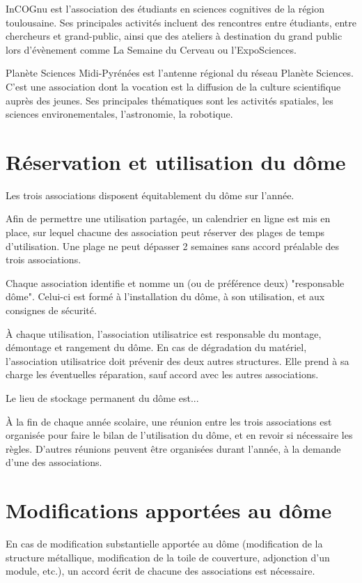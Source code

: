 \documentclass[a4paper,12pt]{article}
\begin{document}
InCOGnu est l'association des étudiants en sciences cognitives de la région
toulousaine. Ses principales activités incluent des rencontres entre étudiants,
entre chercheurs et grand-public, ainsi que des ateliers à destination du grand
public lors d'évènement comme La Semaine du Cerveau ou l'ExpoSciences.

Planète Sciences Midi-Pyrénées est l'antenne régional du réseau Planète
Sciences. C'est une association dont la vocation est la diffusion de la culture
scientifique auprès des jeunes. Ses principales thématiques sont les activités
spatiales, les sciences environementales, l'astronomie, la robotique.

\section{Réservation et utilisation du dôme}

Les trois associations disposent équitablement du dôme sur l'année.

Afin de permettre une utilisation partagée, un calendrier en ligne est mis en
place, sur lequel chacune des association peut réserver des plages de temps
d'utilisation. Une plage ne peut dépasser 2 semaines sans accord préalable des
trois associations.

Chaque association identifie et nomme un (ou de préférence deux) "responsable
dôme". Celui-ci est formé à l'installation du dôme, à son utilisation, et aux
consignes de sécurité.

À chaque utilisation, l'association utilisatrice est responsable du montage,
démontage et rangement du dôme. En cas de dégradation du matériel,
l'association utilisatrice doit prévenir des deux autres structures. Elle prend
à sa charge les éventuelles réparation, sauf accord avec les autres
associations.

Le lieu de stockage permanent du dôme est...

À la fin de chaque année scolaire, une réunion entre les trois associations est
organisée pour faire le bilan de l'utilisation du dôme, et en revoir si
nécessaire les règles. D'autres réunions peuvent être organisées durant
l'année, à la demande d'une des associations.

\section{Modifications apportées au dôme}

En cas de modification substantielle apportée au dôme (modification de la
structure métallique, modification de la toile de couverture, adjonction d'un
module, etc.), un accord écrit de chacune des associations est nécessaire.
\end{document}
